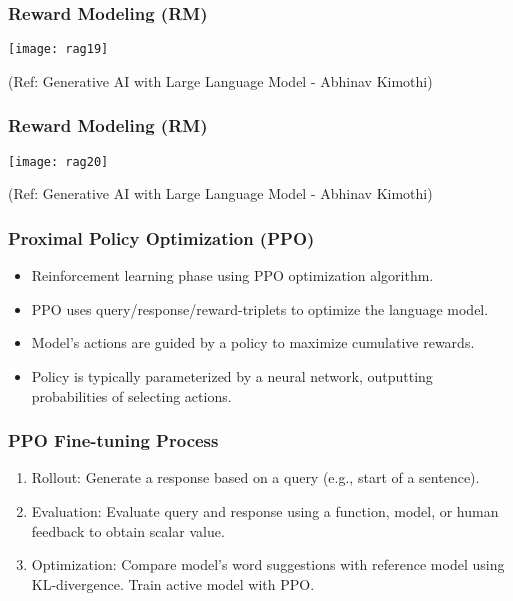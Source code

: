 \begin{frame}[fragile]\frametitle{Reward Modeling (RM)}


		\begin{center}
		\texttt{[image: rag19]}
		\end{center}

{\tiny (Ref: Generative AI with Large Language Model - Abhinav  Kimothi)}

\end{frame}

\begin{frame}[fragile]\frametitle{Reward Modeling (RM)}


		\begin{center}
		\texttt{[image: rag20]}
		\end{center}

{\tiny (Ref: Generative AI with Large Language Model - Abhinav  Kimothi)}

\end{frame}

\begin{frame}[fragile]\frametitle{Proximal Policy Optimization (PPO)}
\begin{itemize}
    \item Reinforcement learning phase using PPO optimization algorithm.
    \item PPO uses query/response/reward-triplets to optimize the language model.
    \item Model's actions are guided by a policy to maximize cumulative rewards.
    \item Policy is typically parameterized by a neural network, outputting probabilities of selecting actions.
\end{itemize}
\end{frame}

\begin{frame}[fragile]\frametitle{PPO Fine-tuning Process}
\begin{enumerate}
    \item Rollout: Generate a response based on a query (e.g., start of a sentence).
    \item Evaluation: Evaluate query and response using a function, model, or human feedback to obtain scalar value.
    \item Optimization: Compare model's word suggestions with reference model using KL-divergence. Train active model with PPO.
\end{enumerate}
\end{frame}


